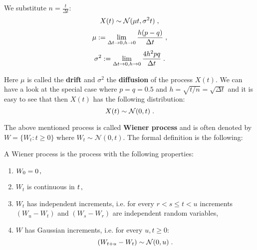 \documentclass[times, utf8, diplomski]{fer}
\begin{document}
We substitute $n=\frac{t}{\Delta t}$:
\begin{equation}
	X(t) \sim \mathcal{N}(\mu t, \sigma^2t)\hspace{0.1cm},
\end{equation}
\begin{equation}
	\mu := \lim_{\Delta t \to 0, h \to 0} \frac{h(p-q)}{\Delta t}\hspace{0.1cm},
\end{equation}
\begin{equation}
	\sigma^2 := \lim_{\Delta t \to 0, h \to 0} \frac{4h^2pq}{\Delta t}\hspace{0.1cm}.
\end{equation}

\noindent Here $\mu$ is called the \textbf{drift} and $\sigma^2$ the \textbf{diffusion} of the process $X(t)$. We can have a look at the special case where $p=q=0.5$ and $h=\sqrt{t/n}=\sqrt{\Delta t}$ and it is easy to see that then $X(t)$ has the following distribution:
\begin{equation} 
	X(t) \sim \mathcal{N}(0, t)\hspace{0.1cm}.
\end{equation}	

\noindent The above mentioned process is called \textbf{Wiener process} and is often denoted by $W = \{W_t:t\ge 0\}$ where $W_t \sim \mathcal{N}(0,t)$. The formal definition is the following:

\begin{definition}
A Wiener process is the process with the following properties:
\begin{enumerate}
	\item $W_0 = 0\hspace{0.05cm},$
	\item $W_t$ is continuous in $t\hspace{0.05cm},$
	\item $W_t$ has independent increments, i.e. for every $r < s \leq t < u$ increments $(W_u - W_t)$ and $(W_s - W_r)$ are independent random variables,
	\item $W$ has Gaussian increments, i.e. for every $u,t \geq 0$: 
		\begin{equation}(W_{t+u} - W_t) \sim \mathcal{N}(0,u)\hspace{0.1cm}. \end{equation}
\end{enumerate}
\end{definition}
\end{document}
